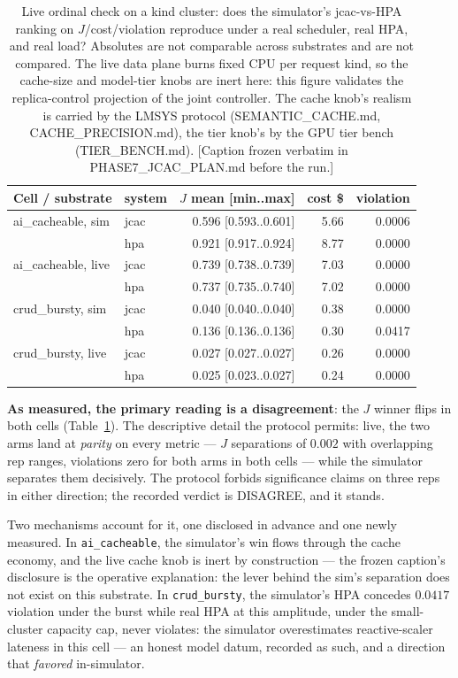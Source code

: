\begin{table}[htbp]
\centering\small
\begin{tabular}{@{}llrrr@{}}
\toprule
\textbf{Cell / substrate} & \textbf{system} & \textbf{$J$ mean [min..max]}
& \textbf{cost \$} & \textbf{violation} \\
\midrule
ai\_cacheable, sim  & jcac & 0.596 [0.593..0.601] & 5.66 & 0.0006 \\
                    & hpa  & 0.921 [0.917..0.924] & 8.77 & 0.0000 \\
ai\_cacheable, live & jcac & 0.739 [0.738..0.739] & 7.03 & 0.0000 \\
                    & hpa  & 0.737 [0.735..0.740] & 7.02 & 0.0000 \\
\addlinespace
crud\_bursty, sim   & jcac & 0.040 [0.040..0.040] & 0.38 & 0.0000 \\
                    & hpa  & 0.136 [0.136..0.136] & 0.30 & 0.0417 \\
crud\_bursty, live  & jcac & 0.027 [0.027..0.027] & 0.26 & 0.0000 \\
                    & hpa  & 0.025 [0.023..0.027] & 0.24 & 0.0000 \\
\bottomrule
\end{tabular}
\caption{Live ordinal check on a kind cluster: does the simulator's
jcac-vs-HPA ranking on $J$/cost/violation reproduce under a real scheduler,
real HPA, and real load? Absolutes are not comparable across substrates and
are not compared. The live data plane burns fixed CPU per request kind, so
the cache-size and model-tier knobs are inert here: this figure validates
the replica-control projection of the joint controller. The cache knob's
realism is carried by the LMSYS protocol (SEMANTIC\_CACHE.md,
CACHE\_PRECISION.md), the tier knob's by the GPU tier bench
(TIER\_BENCH.md). [Caption frozen verbatim in PHASE7\_JCAC\_PLAN.md before
the run.]}
\label{tab:ordinal}
\end{table}

\textbf{As measured, the primary reading is a disagreement}: the $J$ winner
flips in both cells (Table~\ref{tab:ordinal}). The descriptive detail the
protocol permits: live, the two arms land at \emph{parity} on every metric
--- $J$ separations of $0.002$ with overlapping rep ranges, violations zero
for both arms in both cells --- while the simulator separates them
decisively. The protocol forbids significance claims on three reps in
either direction; the recorded verdict is DISAGREE, and it stands.

Two mechanisms account for it, one disclosed in advance and one newly
measured. In \texttt{ai\_cacheable}, the simulator's \jcac{} win flows
through the cache economy, and the live cache knob is inert by construction
--- the frozen caption's disclosure is the operative explanation: the lever
behind the sim's separation does not exist on this substrate. In
\texttt{crud\_bursty}, the simulator's HPA concedes $0.0417$ violation
under the burst while real HPA at this amplitude, under the small-cluster
capacity cap, never violates: the simulator overestimates reactive-scaler
lateness in this cell --- an honest model datum, recorded as such, and a
direction that \emph{favored} \jcac{} in-simulator.

